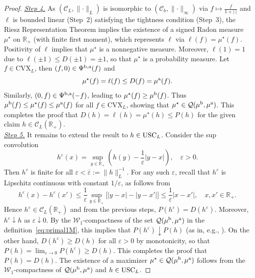 \documentclass[11pt]{article}
\newcommand{\cC}{\mathcal{C}}
\newcommand{\cQ}{\mathcal{Q}}
\newcommand{\cW}{\mathcal{W}}
\newcommand{\R}{\mathbb{R}} %
\theoremstyle{plain}
\theoremstyle{definition}
\theoremstyle{remark}
\theoremstyle{plain}
\begin{document}
\begin{proof}
\underline{\textit{Step 4.}} 
As $(\cC_L,\lVert \cdot \rVert_{L})$ is isomorphic to $(\cC_b,\lVert \cdot \rVert_{\infty})$ via $f \mapsto \frac{f}{1+|\cdot|}$ and $\ell$ is bounded linear (Step~2) satisfying the tightness condition (Step~3), the Riesz Representation Theorem \cite[Theorem~7.10.6]{Bogachev2007} implies the existence of a signed Radon measure $\mu^{\star}$ on $\R_+$ (with finite first moment), which represents $\ell$ via $\ell(f)=\mu^{\star}(f)$. Positivity of $\ell$ implies that $\mu^{\star}$ is a nonnegative measure. Moreover, $\ell(1) = 1$ due to  $\ell(\pm 1) \le D(\pm 1)  = \pm 1$, so that $\mu^{\star}$ is a probability measure. Let $f \in \text{CVX}_L$, then    $(f,0)\in \Psi^{\rm{b,a}}(f)$ and 
$$\mu^{\star}(f) = \ell(f) \le D(f) = \mu^{\rm{a}}(f).$$
Similarly, $(0,f)\in \Psi^{\rm{b,a}}(-f)$, leading to $\mu^{\star}(f) \ge  \mu^{\rm{b}}(f)$. Thus $\mu^{\rm{b}}(f)\leq \mu^{\star}(f) \leq \mu^{\rm{a}}(f)$ for all $f \in \text{CVX}_L$, showing that $\mu^{\star} \in \cQ(\mu^{\rm{b}},\mu^{\rm{a}})$. This completes the proof that $D(h) = \ell(h)=\mu^{\star}(h) \le P(h)$ for the given claim $h\in \cC_L(\R_+)$.  \\[-0.75em] 

\underline{\textit{Step 5.}} It remains to extend the result to $h \in \textnormal{USC}_{L}$. Consider the sup convolution
\begin{equation*}%
    h^{\varepsilon}(x) =  \sup_{y\in \R_+} \left( h(y)  - \frac{1}{\varepsilon} |y-x|\right), \quad \varepsilon > 0.
\end{equation*}
Then $ h^{\varepsilon}$ is finite for all $\varepsilon < \overline{\varepsilon} :=\lVert h \rVert_L^{-1}$. 
For any such $\varepsilon$, recall that $h^{\varepsilon}$ is  Lipschitz continuous with constant $1/\varepsilon$, as follows from
$$ h^{\varepsilon}(x) - h^{\varepsilon}(x') \le \frac{1}{\varepsilon} \sup_{y\in \R_+} \big [ |y-x| - |y-x'| \big ] \le \frac{1}{\varepsilon}  |x-x'|, \quad x,x' \in \R_+.$$
%
Hence $h^{\varepsilon} \in \cC_L(\R_+)$ and  from the previous steps,  $P(h^{\varepsilon}) = D(h^{\varepsilon})$. Moreover, $h^{\varepsilon} \downarrow h$ as $\varepsilon\downarrow 0$. By the $\cW_1$-compactness of the set $\cQ(\mu^{\rm b}, \mu^{\rm a})$ in the definition~\eqref{eq:primal1M}, this implies that  $P(h^{\varepsilon})\downarrow P(h)$ (as in, e.g., \cite[Theorem~31]{DenisHuPeng2011}). On the other hand, $D(h^{\varepsilon}) \ge D(h)$ for all $\varepsilon >0$ by monotonicity, so that $P(h) = \lim_{\varepsilon \to 0 }P(h^{\varepsilon}) \ge D(h)$. This completes the proof that $P(h) = D(h)$. The existence of a maximizer $\mu^{\star}\in \cQ(\mu^{\rm b}, \mu^{\rm a})$ follows from the $\cW_1$-compactness of $\cQ(\mu^{\rm b}, \mu^{\rm a})$ and $h\in \textnormal{USC}_{L}$.
\end{proof}
\end{document}
